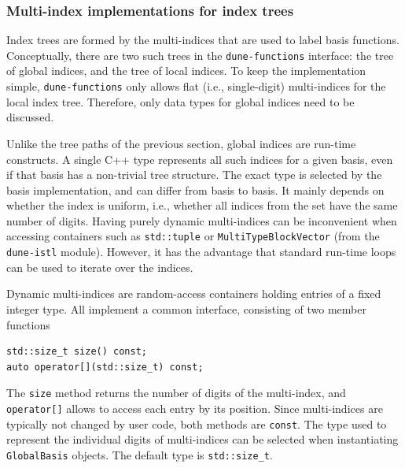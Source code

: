 \documentclass[a4paper,10pt,headings=normal,bibliography=totoc]{scrartcl}
\newcommand{\cpp}[1]{\lstinline[basicstyle=\ttfamily]!#1!}
\newcommand{\cppbreak}[1]{\lstinline[basicstyle=\ttfamily,breaklines]!#1!}
\newcommand{\dunemodule}[1]{\texttt{#1}}
\begin{document}
\subsubsection{Multi-index implementations for index trees}
\label{sec:multi_indicies_for_index_trees}

Index trees are formed by the multi-indices that are used to label basis functions.
Conceptually, there are two such trees in the \dunemodule{dune-functions} interface:
the tree of global indices, and the tree of local indices.  To keep the implementation simple,
\dunemodule{dune-functions} only allows flat (i.e., single-digit) multi-indices for the local index tree.
Therefore, only data types for global indices need to be discussed.

Unlike the tree paths of the previous section,
global indices are run-time constructs.  A single C++ type represents all such
indices for a given basis, even if that basis has a non-trivial tree structure.
The exact type is selected by the basis implementation, and can differ from basis to basis.
It mainly depends on whether the index is uniform, i.e., whether all indices from the
set have the same number of digits.
Having purely dynamic multi-indices can be inconvenient when accessing
containers such as \cpp{std::tuple}
or \cpp{MultiTypeBlockVector} (from the \dunemodule{dune-istl}
module). However, it has the advantage that standard run-time loops can be used
to iterate over the indices.

Dynamic multi-indices are random-access containers holding entries of a fixed integer type.
All implement a common interface, consisting of two member functions
%
\begin{lstlisting}[style=Interface]
std::size_t size() const;
auto operator[](std::size_t) const;
\end{lstlisting}
%
The \cpp{size} method returns the number of digits of the multi-index,
and \cppbreak{operator[]} allows to access
each entry by its position. Since multi-indices are
typically not changed by user code, both methods are \cpp{const}.
The type used to represent
the individual digits of multi-indices can be selected when instantiating \cpp{GlobalBasis}
objects.  The default type is \cpp{std::size_t}.
\end{document}
